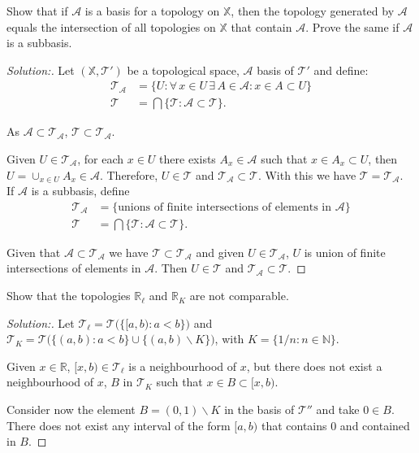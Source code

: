 \documentclass[a4paper,12pt, reqno]{article}
\theoremstyle{definition}
\newenvironment{exerr}[1]{
  \renewcommand\theexeralt{#1}
  \exeralt
}{\endexeralt}
\newenvironment{solution}{\begin{proof}[Solution:]}{\end{proof}}
\newcommand{\R}{\mathbb{R}}
\newcommand{\T}{\mathscr{T}}
\newcommand{\A}{\mathscr{A}}
\newcommand{\N}{\mathbb{N}}
\newcommand{\X}{\mathbb{X}}
\begin{document}
\begin{exerr}{5}
  Show that if $\A$ is a basis for a topology on $\X$, then the topology generated by $\A$ equals the intersection of all topologies on $\X$ that contain $\A$. Prove the same if $\A$ is a subbasis.
\end{exerr}
\begin{solution}
  Let $(\X,\T')$ be a topological space, $\A$ basis of $\T'$ and define:
  \begin{align*}
    \T_{\A} & = \{ U : \forall\,x\in U\,\exists \,A\in\A : x\in A\subset U \} \\
    \T      & = \bigcap\{ \T : \A\subset\T \}.
  \end{align*}

  As $\A\subset\T_{\A}$, $\T\subset\T_{\A}$.

  Given $U\in\T_{\A}$, for each $x\in U$ there exists $A_{x}\in\A$ such that $x\in A_{x}\subset U$, then $U = \cup_{x\in U}A_{x}\in \A$. Therefore, $U\in \T$ and $\T_{\A}\subset\T$. With this we have $\T=\T_{\A}$.\\

  If $\A$ is a subbasis, define
  \begin{align*}
    \T_{\A} & = \{ \text{unions of finite intersections of elements in $\A$} \} \\
    \T      & = \bigcap \{ \T : \A\subset\T  \}.
  \end{align*}

  Given that $\A\subset\T_{\A}$ we have $\T\subset\T_{\A}$ and given $U\in\T_{\A}$, $U$ is union of finite intersections of elements in $\A$. Then $U\in\T$ and $\T_{\A}\subset\T$.
\end{solution}

\begin{exerr}{6}
  Show that the topologies $\R_{\ell}$ and $\R_{K}$ are not comparable.
\end{exerr}
\begin{solution}
  Let $\T_{\ell} = \T\big( \{ [a,b) : a<b \} \big)$ and $\T_{K} = \T\big( \{ (a,b) : a<b \}\cup\{ (a,b)\backslash K \} \big)$, with $K = \{ 1/n : n\in\N \}$.

  Given $x\in\R$, $[x,b)\in\T_{\ell}$ is a neighbourhood of $x$, but there does not exist a neighbourhood of $x$, $B$ in $\T_{K}$ such that $x\in B\subset [x,b)$.

  Consider now the element $B=(0,1)\backslash K$ in the basis of $\T''$ and take $0\in B$. There does not exist any interval of the form $[a,b)$ that contains $0$ and contained in $B$.
\end{solution}
\end{document}

